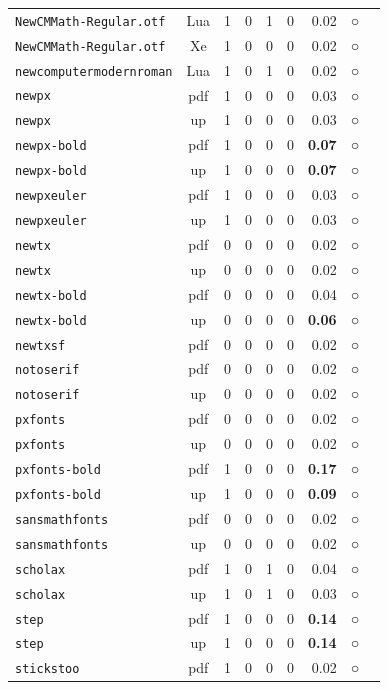 \begin{longtable}{@{}lcrrrrrcl@{}}
\texttt{NewCMMath-Regular.otf} & Lua & 1 & 0 & 1 & 0 & 0.02 & ○ & \\
\texttt{NewCMMath-Regular.otf} & Xe & 1 & 0 & 0 & 0 & 0.02 & ○ & \\
\texttt{newcomputermodernroman} & Lua & 1 & 0 & 1 & 0 & 0.02 & ○ & \\
\texttt{newpx} & pdf & 1 & 0 & 0 & 0 & 0.03 & ○ & \\
\texttt{newpx} & up & 1 & 0 & 0 & 0 & 0.03 & ○ & \\
\texttt{newpx-bold} & pdf & 1 & 0 & 0 & 0 & \textbf{0.07} & ○ & \\
\texttt{newpx-bold} & up & 1 & 0 & 0 & 0 & \textbf{0.07} & ○ & \\
\texttt{newpxeuler} & pdf & 1 & 0 & 0 & 0 & 0.03 & ○ & \\
\texttt{newpxeuler} & up & 1 & 0 & 0 & 0 & 0.03 & ○ & \\
\texttt{newtx} & pdf & 0 & 0 & 0 & 0 & 0.02 & ○ & \\
\texttt{newtx} & up & 0 & 0 & 0 & 0 & 0.02 & ○ & \\
\texttt{newtx-bold} & pdf & 0 & 0 & 0 & 0 & 0.04 & ○ & \\
\texttt{newtx-bold} & up & 0 & 0 & 0 & 0 & \textbf{0.06} & ○ & \\
\texttt{newtxsf} & pdf & 0 & 0 & 0 & 0 & 0.02 & ○ & \\
\texttt{notoserif} & pdf & 0 & 0 & 0 & 0 & 0.02 & ○ & \\
\texttt{notoserif} & up & 0 & 0 & 0 & 0 & 0.02 & ○ & \\
\texttt{pxfonts} & pdf & 0 & 0 & 0 & 0 & 0.02 & ○ & \\
\texttt{pxfonts} & up & 0 & 0 & 0 & 0 & 0.02 & ○ & \\
\texttt{pxfonts-bold} & pdf & 1 & 0 & 0 & 0 & \textbf{0.17} & ○ & \\
\texttt{pxfonts-bold} & up & 1 & 0 & 0 & 0 & \textbf{0.09} & ○ & \\
\texttt{sansmathfonts} & pdf & 0 & 0 & 0 & 0 & 0.02 & ○ & \\
\texttt{sansmathfonts} & up & 0 & 0 & 0 & 0 & 0.02 & ○ & \\
\texttt{scholax} & pdf & 1 & 0 & 1 & 0 & 0.04 & ○ & \\
\texttt{scholax} & up & 1 & 0 & 1 & 0 & 0.03 & ○ & \\
\texttt{step} & pdf & 1 & 0 & 0 & 0 & \textbf{0.14} & ○ & \\
\texttt{step} & up & 1 & 0 & 0 & 0 & \textbf{0.14} & ○ & \\
\texttt{stickstoo} & pdf & 1 & 0 & 0 & 0 & 0.02 & ○ & \\

\end{longtable}
